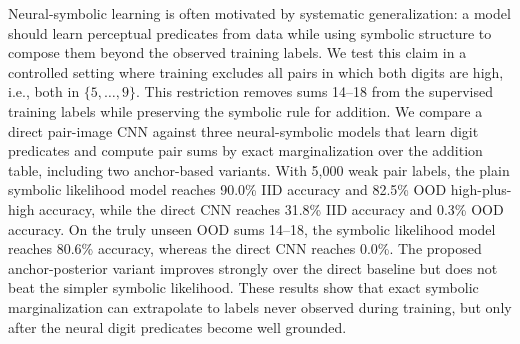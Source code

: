 Neural-symbolic learning is often motivated by systematic generalization: a model should learn perceptual predicates from data while using symbolic structure to compose them beyond the observed training labels. We test this claim in a controlled \addmnist setting where training excludes all pairs in which both digits are high, i.e., both in $\{5,\ldots,9\}$. This restriction removes sums 14--18 from the supervised training labels while preserving the symbolic rule for addition. We compare a direct pair-image CNN against three neural-symbolic models that learn digit predicates and compute pair sums by exact marginalization over the addition table, including two anchor-based variants. With 5,000 weak pair labels, the plain symbolic likelihood model reaches 90.0\% IID accuracy and 82.5\% OOD high-plus-high accuracy, while the direct CNN reaches 31.8\% IID accuracy and 0.3\% OOD accuracy. On the truly unseen OOD sums 14--18, the symbolic likelihood model reaches 80.6\% accuracy, whereas the direct CNN reaches 0.0\%. The proposed anchor-posterior variant improves strongly over the direct baseline but does not beat the simpler symbolic likelihood. These results show that exact symbolic marginalization can extrapolate to labels never observed during training, but only after the neural digit predicates become well grounded.
